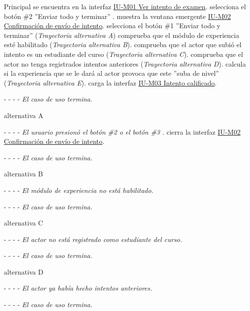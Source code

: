 
\begin{UCtrayectoria}{Principal}
    \actor se encuentra en la interfaz \hyperref[IUM01]{IU-M01 Ver intento de examen}.
    \actor selecciona el botón \#2 ''Enviar todo y terminar'' .
    \sistema muestra la ventana emergente \hyperref[IUM02]{IU-M02 Confirmación de envío de intento}.
    \actor selecciona el botón \#1 ''Enviar todo y terminar'' ({\it Trayectoria alternativa A})
    \sistema comprueba que el módulo de experiencia esté habilitado ({\it Trayectoria alternativa B}).
    \sistema comprueba que el actor que subió el intento es un estudiante del curso ({\it Trayectoria alternativa C}).
    \sistema comprueba que el actor no tenga registrados intentos anteriores ({\it Trayectoria alternativa D}).
    \sistema calcula si la experiencia que se le dará al actor provoca que este ''suba de nivel'' ({\it Trayectoria alternativa E}).
    \sistema carga la interfaz \hyperref[IUM03]{IU-M03 Intento calificado}.
    \item[- -] - - {\em El caso de uso termina.}
\end{UCtrayectoria}

\begin{UCtrayectoria}{alternativa A}
    \item[- -] - - {\em El usuario presionó el botón \#2  o  el botón \#3 .}
    \sistema cierra la interfaz \hyperref[IUM02]{IU-M02 Confirmación de envío de intento}.
    \item[- -] - - {\em El caso de uso termina.}
\end{UCtrayectoria}

\begin{UCtrayectoria}{alternativa B}
    \item[- -] - - {\em El módulo de experiencia no está habilitado.}
    \item[- -] - - {\em El caso de uso termina.}
\end{UCtrayectoria}

\begin{UCtrayectoria}{alternativa C}
    \item[- -] - - {\em El actor no está registrado como estudiante del curso.}
    \item[- -] - - {\em El caso de uso termina.}
\end{UCtrayectoria}

\begin{UCtrayectoria}{alternativa D}
    \item[- -] - - {\em El actor ya había hecho intentos anteriores.}
    \item[- -] - - {\em El caso de uso termina.}
\end{UCtrayectoria}

